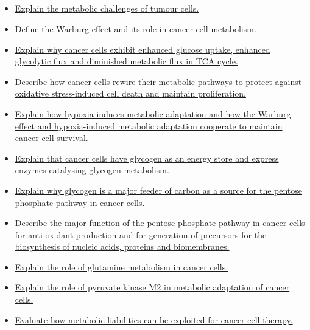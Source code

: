 \documentclass[10pt, a4paper]{article}
\begin{document}
\subsection{} \begin{itemize} \item \href{https://www.notion.so/d4ce381b7f534a148ee55eb9997128b8}{Explain the metabolic challenges of tumour cells.} \item \href{https://www.notion.so/a3130a0aa79e491dbf60bf40fa484833}{Define the Warburg effect and its role in cancer cell metabolism.} \item \href{https://www.notion.so/8656074ac53049cca19f2e91662f26c5}{Explain why cancer cells exhibit enhanced glucose uptake, enhanced glycolytic flux and diminished metabolic flux in TCA cycle.} \item \href{https://www.notion.so/51f319d1358a4b6c8a831bd24d8d954b}{Describe how cancer cells rewire their metabolic pathways to protect against oxidative stress-induced cell death and maintain proliferation.} \item \href{https://www.notion.so/3d80a13f951642b08d0494523115d609}{Explain how hypoxia induces metabolic adaptation and how the Warburg effect and hypoxia-induced metabolic adaptation cooperate to maintain cancer cell survival.} \item \href{https://www.notion.so/12c6c8d328c6453d947e74647293bc26}{Explain that cancer cells have glycogen as an energy store and express enzymes catalysing glycogen metabolism.} \item \href{https://www.notion.so/b4bbdf935a0f467f903c88e87f7cb202}{Explain why glycogen is a major feeder of carbon as a source for the pentose phosphate pathway in cancer cells.} \item \href{https://www.notion.so/73bee1bd9c4b4ff7a26b89f7a1a94cbc}{Describe the major function of the pentose phosphate pathway in cancer cells for anti-oxidant production and for generation of precursors for the biosynthesis of nucleic acids, proteins and biomembranes.} \item \href{https://www.notion.so/00acb2a29d454c3fb5206e0dd05f5482}{Explain the role of glutamine metabolism in cancer cells.} \item \href{https://www.notion.so/06c16b8cec9f4a1ba32fb1301408eab8}{Explain the role of pyruvate kinase M2 in metabolic adaptation of cancer cells.} \item \href{https://www.notion.so/85945f627f9748adbb9ce66e1b580ee0}{Evaluate how metabolic liabilities can be exploited for cancer cell therapy.} \end{itemize}
\end{document}
